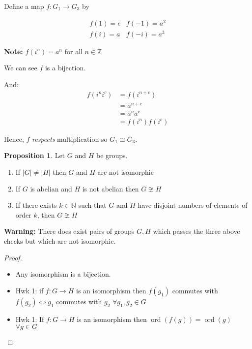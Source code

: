 \documentclass{article}
\theoremstyle{definition}
\newtheorem{proposition}[theorem]{Proposition}
\newcommand{\ism}{\cong}
\DeclareMathOperator{\ord}{\text{ord}}
\begin{document}
Define a map $f:G_1 \rightarrow G_3$ by 

\begin{equation*}
  \begin{matrix}
    f(1)=e & f(-1) = a^2 \\
    f(i)=a & f(-i) = a^3
  \end{matrix}
  \label{}
\end{equation*}

\textbf{Note:} $f(i^n) = a^n$ for all $n \in \mathbb{Z}$

We can see $f$ is a bijection.

And: 
\begin{align*}
  f(i^ni^c) &= f(i^{n+c})\\
  &= a^{n+c} \\
  &= a^n a^c \\
  &= f(i^n)f(i^c)
\end{align*}

Hence, $f$ \emph{respects} multiplication so $G_1 \ism G_3.$\\
\begin{proposition}
  Let $G$ and $H$ be groups.
  \begin{enumerate}
    \item If $|G| \neq |H|$ then $G$ and $H$ are not isomorphic
    \item If $G$ is abelian and $H$ is not abelian then $G \not\ism H$
    \item If there exists $k \in \mathbb{N}$ such that $G$ and $H$ have disjoint numbers of elements of order $k$, then $G \not\ism H$
  \end{enumerate}
\end{proposition}

\textbf{Warning:} There does exist pairs of groups $G, H$ which passes the three above checks but which are not isomorphic.

\begin{proof}\hfill
  \begin{itemize}
    \item Any isomorphism is a bijection.
    \item Hwk 1: 
      if $f : G \rightarrow H$ is an isomorphism then $f(g_1)$ commutes with $f(g_2) \iff g_1$ commutes with $g_2$ $\forall g_1,g_2 \in G$
    \item Hwk 1: 
      If $f:G\rightarrow H$ is an isomorphism then $\ord(f(g))=\ord(g)$ $\forall g\in G$
  \end{itemize}
\end{proof}
\end{document}
